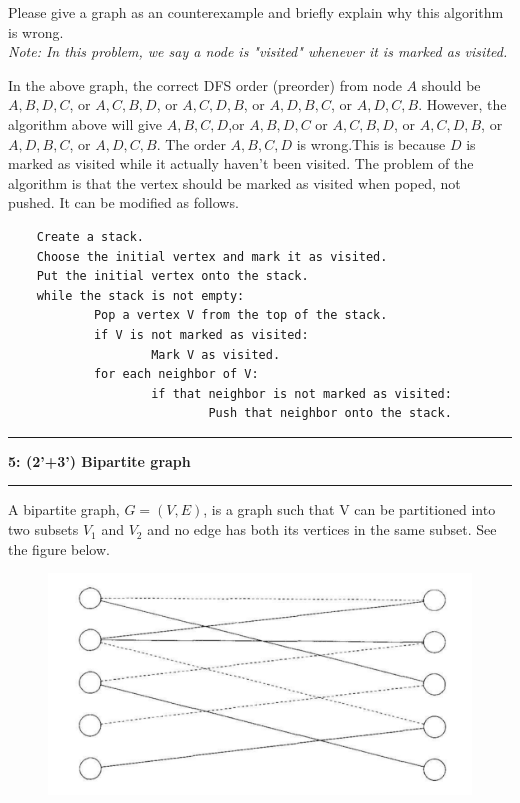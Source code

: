 \documentclass[10.5pt]{article}
\newcommand\question[2]{\vspace{.25in}\hrule\textbf{#1: #2}\vspace{.5em}\hrule\vspace{.10in}}
\begin{document}
Please give a graph as an counterexample and briefly explain why this algorithm is wrong.
\\
\textit{Note: In this problem, we say a node is "visited" whenever it is marked as visited.}\\
\begin{center}
\end{center}
In the above graph, the correct DFS order (preorder) from node $A$ should be $A, B, D, C$, or $A, C, B, D$, or $A, C, D, B$, or $A, D, B, C$, or $A, D, C, B$. However, the algorithm above will give $A, B, C, D$,or $A, B, D, C$ or $A, C, B, D$, or $A, C, D, B$, or $A, D, B, C$, or $A, D, C, B$. The order $A, B, C, D$ is wrong.This is because $D$ is marked as visited while it actually haven't been visited. The problem of the algorithm is that the vertex should be marked as visited when poped, not pushed. It can be modified as follows.
\begin{lstlisting}
	Create a stack.
	Choose the initial vertex and mark it as visited.
	Put the initial vertex onto the stack.
	while the stack is not empty:
			Pop a vertex V from the top of the stack.
			if V is not marked as visited:
					Mark V as visited.
			for each neighbor of V:
					if that neighbor is not marked as visited:
							Push that neighbor onto the stack.
\end{lstlisting}

\pagebreak
\question{5}{(2'+3') Bipartite graph}

A bipartite graph, $G = (V,E)$, is a graph such that V can be partitioned into two subsets $V_1$ and $V_2$
and no edge has both its vertices in the same subset. See the figure below.

\begin{figure}[htbp]
	\centering
	\includegraphics{bipartite_graph.png}
	\label{fig:my_label}
\end{figure}
\end{document}
